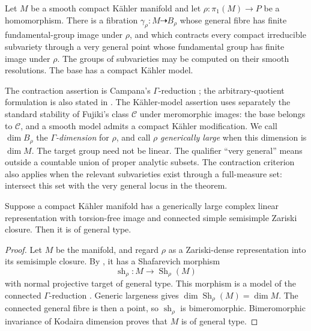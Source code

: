 \begin{theorem}\label{thm:gamma-reduction}
Let \(M\) be a smooth compact K\"ahler manifold and let
\(\rho:\pi_1(M)\to P\) be a homomorphism. There is a fibration
\(\gamma_\rho:M\dashrightarrow B_\rho\) whose general fibre has finite
fundamental-group image under \(\rho\), and which contracts every
compact irreducible subvariety through a very general point whose
fundamental group has finite image under \(\rho\). The groups of
subvarieties may be computed on their smooth resolutions. The base has
a compact K\"ahler model.
\end{theorem}

The contraction assertion is Campana's \(\Gamma\)-reduction
\cite[Theorem~3.5 and Remark~3.6]{CampanaGamma}; the arbitrary-quotient
formulation is also stated in
\cite[author's version, Theorem~2.1 and Corollary~2.2]{CCE2015}.
The K\"ahler-model assertion uses separately the standard stability
of Fujiki's class \(\mathcal C\) under meromorphic images: the base
belongs to \(\mathcal C\), and a smooth model admits a compact
K\"ahler modification.
We call \(\dim B_\rho\) the \emph{\(\Gamma\)-dimension} for \(\rho\),
and call \(\rho\) \emph{generically large} when this dimension is
\(\dim M\). The target group need not be linear. The qualifier
``very general'' means outside a countable union of proper analytic
subsets. The contraction criterion also applies when the relevant
subvarieties exist through a full-measure set: intersect this set with
the very general locus in the theorem.

\begin{theorem}\label{thm:linear-general-type}
Suppose a compact K\"ahler manifold has a generically large complex
linear representation with torsion-free image and connected simple
semisimple Zariski closure. Then it is of general type.
\end{theorem}

\begin{proof}
Let \(M\) be the manifold, and regard \(\rho\) as a Zariski-dense
representation into its semisimple closure. By
\cite[author's version, Theorem~1 and Theorem~6.3]{CCE2015}, it has
a Shafarevich morphism
\[
 \operatorname{sh}_\rho:M\longrightarrow\operatorname{Sh}_\rho(M)
\]
with normal projective target of general type. This morphism is a
model of the connected \(\Gamma\)-reduction
\cite[author's version, Definition~2.13]{CCE2015}. Generic largeness
gives \(\dim\operatorname{Sh}_\rho(M)=\dim M\). The connected general fibre
is then a point, so \(\operatorname{sh}_\rho\) is bimeromorphic.
Bimeromorphic invariance of Kodaira dimension proves that \(M\) is
of general type.
\end{proof}

